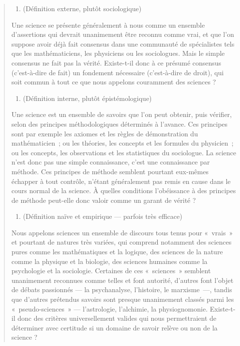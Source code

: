 \documentclass[a4paper]{article}
\begin{document}
\begin{quote}
\begin{enumerate}
\item (Définition externe, plutôt sociologique)
\end{enumerate}

  Une science se présente généralement à nous comme un ensemble
  d'assertions qui devrait unanimement être reconnu comme vrai, et que
  l'on suppose avoir déjà fait consensus dans une communauté de
  spécialistes tels que les mathématiciens, les physiciens ou les
  sociologues. Mais le simple consensus ne fait pas la vérité.
  Existe-t-il donc à ce présumé consensus (c'est-à-dire de fait) un
  fondement nécessaire (c'est-à-dire de droit), qui soit commun à tout
  ce que nous appelons couramment des sciences ?

\begin{enumerate}
\item (Définition interne, plutôt épistémologique)
\end{enumerate}

  Une science est un ensemble de savoirs que l'on peut obtenir, puis
  vérifier, selon des principes méthodologiques déterminés à l'avance.
  Ces principes sont par exemple les axiomes et les règles de
  démonstration du mathématicien ; ou les théories, les concepts et les
  formules du physicien ; ou les concepts, les observations et les
  statistiques du sociologue. La science n'est donc pas une simple
  connaissance, c'est une connaissance par méthode. Ces principes de
  méthode semblent pourtant eux-mêmes échapper à tout contrôle, n'étant
  généralement pas remis en cause dans le cours normal de la science. À
  quelles conditions l'obéissance à des principes de méthode peut-elle
  donc valoir comme un garant de vérité ?

\begin{enumerate}
\item (Définition naïve et empirique --- parfois très efficace)
\end{enumerate}

  Nous appelons sciences un ensemble de discours tous tenus pour « vrais »
  et pourtant de natures très variées, qui comprend notamment des
  sciences pures comme les mathématiques et la logique, des sciences de
  la nature comme la physique et la biologie, des sciences humaines
  comme la psychologie et la sociologie. Certaines de ces « sciences »
  semblent unanimement reconnues comme telles et font autorité, d'autres
  font l'objet de débats passionnés --- la psychanalyse, l'histoire, le
  marxisme ---, tandis que d'autres prétendus savoirs sont presque
  unanimement classés parmi les « pseudo-sciences » --- l'astrologie,
  l'alchimie, la physiognomonie. Existe-t-il donc des critères
  universellement valides qui nous permettraient de déterminer avec
  certitude si un domaine de savoir relève ou non de la science ?
\end{quote}
\end{document}
